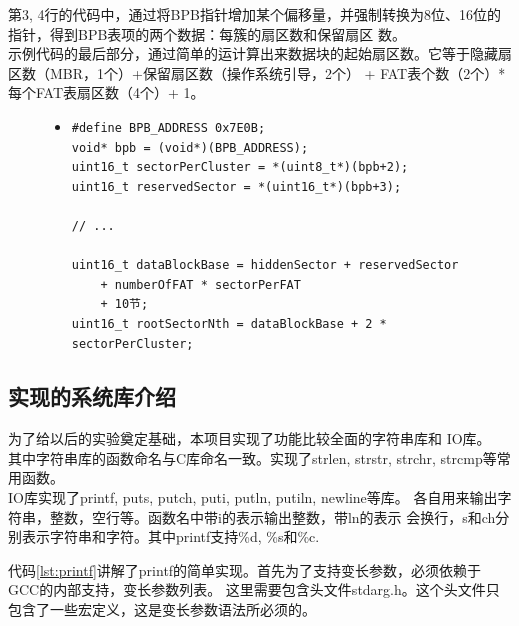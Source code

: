 \documentclass[a4paper]{article}
\begin{document}
    第3, 4行的代码中，通过将BPB指针增加某个偏移量，并强制转换为8位、16位的指针，得到BPB表项的两个数据：每簇的扇区数和保留扇区
    数。 \\
    
    示例代码的最后部分，通过简单的运计算出来数据块的起始扇区数。它等于隐藏扇区数（MBR，1个）+保留扇区数（操作系统引导，2个） +
    FAT表个数（2个）* 每个FAT表扇区数（4个）+ 1。

    \begin{figure}[!hbt]
    \begin{itemize}
    \item[] \begin{lstlisting}[style=mystyle, label=lst:DBR, caption=操作系统引导的部分源码]
#define BPB_ADDRESS 0x7E0B;
void* bpb = (void*)(BPB_ADDRESS);
uint16_t sectorPerCluster = *(uint8_t*)(bpb+2);
uint16_t reservedSector = *(uint16_t*)(bpb+3);

// ...

uint16_t dataBlockBase = hiddenSector + reservedSector 
    + numberOfFAT * sectorPerFAT
    + 10节;
uint16_t rootSectorNth = dataBlockBase + 2 * sectorPerCluster;

    \end{lstlisting}
    \end{itemize}
    \end{figure}

    \subsection{实现的系统库介绍}\label{sec:library}
    为了给以后的实验奠定基础，本项目实现了功能比较全面的字符串库和
    IO库。\\
    
    其中字符串库的函数命名与C库命名一致。实现了strlen, strstr, 
    strchr, strcmp等常用函数。\\
    
    IO库实现了printf, puts, putch, puti, putln, putiln, newline等库。
    各自用来输出字符串，整数，空行等。函数名中带i的表示输出整数，带ln的表示
    会换行，s和ch分别表示字符串和字符。其中printf支持\%d, \%s和\%c.

    代码\ref{lst:printf}讲解了printf的简单实现。首先为了支持变长参数，必须依赖于GCC的内部支持，变长参数列表。
    这里需要包含头文件stdarg.h。这个头文件只包含了一些宏定义，这是变长参数语法所必须的。\\ 
\end{document}

